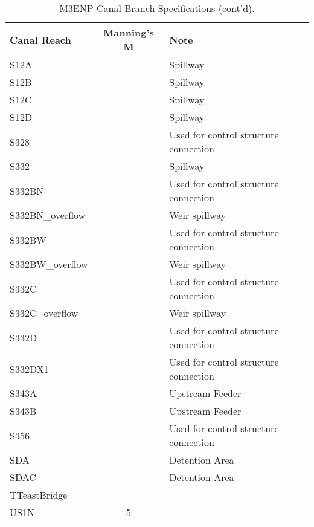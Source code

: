 \clearpage

\begin{table}[!h]
\caption{M3ENP Canal Branch Specifications (cont'd).}
\label{tab:canals2}
\begin{tabular}{lcl}
\hline
Canal Reach        & Manning's M  & Note                                        \\
\hline
S12A               &              & Spillway                                    \\
S12B               &              & Spillway                                    \\
S12C               &              & Spillway                                    \\
S12D               &              & Spillway                                    \\
S328               &              & Used for control structure connection       \\
S332               &              & Spillway                                    \\
S332BN             &              & Used for control structure connection       \\
S332BN\_overflow   &              & Weir spillway                               \\
S332BW             &              & Used for control structure connection       \\
S332BW\_overflow   &              & Weir spillway                               \\
S332C              &              & Used for control structure connection       \\
S332C\_overflow    &              & Weir spillway                               \\
S332D              &              & Used for control structure connection       \\
S332DX1            &              & Used for control structure connection       \\
S343A              &              & Upstream Feeder                             \\
S343B              &              & Upstream Feeder                             \\
S356               &              & Used for control structure connection       \\
SDA                &              & Detention Area                              \\
SDAC               &              & Detention Area                              \\
TTeastBridge       &              &                                             \\
US1N               & 5            &                                             \\
\hline
\end{tabular}
\end{table}


\cleardoublepage

